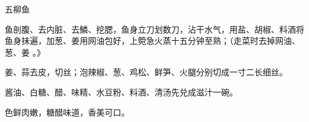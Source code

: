\begin{recipe}{五柳鱼}

\ingredients


\cooking

\step 鱼剖腹、去内脏、去鱗、挖腮，鱼身立刀划数刀，沾干水气，用盐、胡椒、料酒将
鱼身抹遍，加葱、姜用网油包好，上箢急火蒸十五分钟至熟；（走菜时去掉网油、葱、姜
。》

\step 姜、蒜去皮，切丝；泡辣椒、葱、鸡松、鲜笋、火腿分别切成一寸二长细丝。

\step 酱油、白糖、醋、味精、水豆粉、料酒、清汤先兑成滋汁一碗。

\notes

色鲜肉嫩，糖醋味道，香美可口。

\end{recipe}

